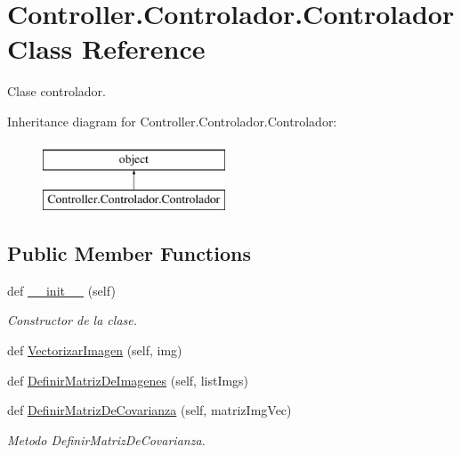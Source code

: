 \hypertarget{class_controller_1_1_controlador_1_1_controlador}{}\section{Controller.\+Controlador.\+Controlador Class Reference}
\label{class_controller_1_1_controlador_1_1_controlador}


Clase controlador.  


Inheritance diagram for Controller.\+Controlador.\+Controlador\+:\begin{figure}[H]
\begin{center}
\leavevmode
\includegraphics[height=2.000000cm]{class_controller_1_1_controlador_1_1_controlador}
\end{center}
\end{figure}
\subsection*{Public Member Functions}
\begin{DoxyCompactItemize}
\item 
def \hyperlink{class_controller_1_1_controlador_1_1_controlador_ad30f895c86fb2085fbd3b2c0a1c9f38c}{\+\_\+\+\_\+init\+\_\+\+\_\+} (self)
\begin{DoxyCompactList}\small\item\em Constructor de la clase. \end{DoxyCompactList}\item 
def \hyperlink{class_controller_1_1_controlador_1_1_controlador_a4bbeb1232cf73c6c9113e7ffda714b63}{Vectorizar\+Imagen} (self, img)
\item 
def \hyperlink{class_controller_1_1_controlador_1_1_controlador_a88254f919a6b1d7ed25e2f54b528a15c}{Definir\+Matriz\+De\+Imagenes} (self, list\+Imgs)
\item 
def \hyperlink{class_controller_1_1_controlador_1_1_controlador_a4c342a4b7f56c2f8a566cdf62030816c}{Definir\+Matriz\+De\+Covarianza} (self, matriz\+Img\+Vec)
\begin{DoxyCompactList}\small\item\em Metodo Definir\+Matriz\+De\+Covarianza. \end{DoxyCompactList}\end{DoxyCompactItemize}
